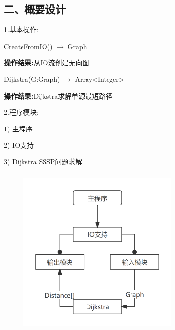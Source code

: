 \documentclass[UTF8, a4paper]{ctexart}
\begin{document}
\subsection*{二、概要设计}
\par
1.\;基本操作: \par
	CreateFromIO() $\rightarrow$ Graph \par
	\qquad\textbf{操作结果:}\;从IO流创建无向图 \par
	Dijkstra(G:Graph) $\rightarrow$ Array<Integer> \par
	\qquad\textbf{操作结果:}\;Dijkstra求解单源最短路径 \par
2.\;程序模块: \par
1) 主程序 \par
2) IO支持 \par
3) Dijkstra SSSP问题求解 \par
\begin{figure}[H]
	\begin{minipage}[t]{\linewidth}
		\centering
		\includegraphics[width=80mm,height=85mm]{./assets/DS09-1}
	\end{minipage}
\end{figure}
\end{document}
